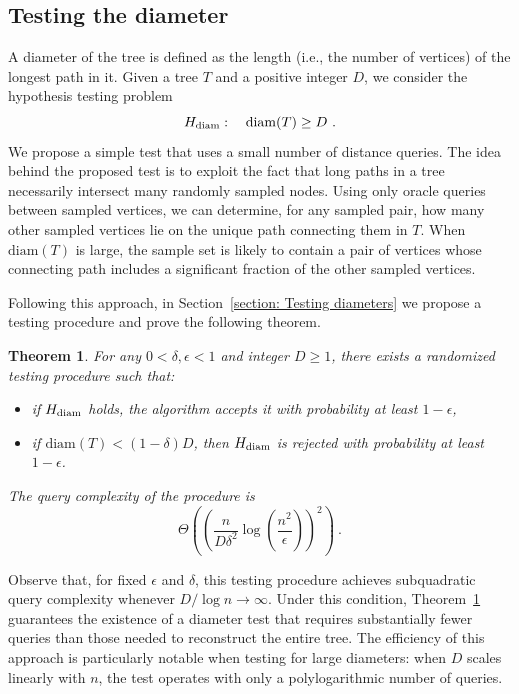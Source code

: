 \documentclass[12pt]{article}
\newtheorem{theorem}{Theorem}[section]
\newcommand{\diam}[1]{\mathrm{diam}\!\left(#1\right)}
\begin{document}
\subsection{Testing the diameter}\label{sec:diam0}

A diameter of the tree is defined as the length (i.e., the number of vertices) of the longest path in it.  Given a tree $T$ and a positive integer $D$, we consider the hypothesis testing problem
\[
H_{\rm diam}: \quad  \diam{T} \ge D~.
\]
We propose a simple test that uses a small number of distance queries.
The idea behind the proposed test is to exploit the fact that long paths in a tree necessarily intersect many randomly sampled nodes. 
Using only oracle queries between sampled vertices, we can determine, for any sampled pair, how many other sampled vertices lie on the unique path connecting them in \(T\).
When \(\diam{T}\) is large, the sample set is likely to contain a pair of vertices whose connecting path includes a significant fraction of the other sampled vertices.

Following this approach, in Section~\ref{section: Testing diameters}  we propose a testing procedure and prove the following theorem.
\begin{theorem}\label{thm: diameter test}
For any $0<\delta,\epsilon<1$ and integer $D\ge 1$, there exists a randomized testing procedure such that:
\begin{itemize}
    \item [(i)] if $H_{\rm diam}$ holds, the algorithm accepts it with probability at least $1 - \epsilon$, 
    \item [(ii)] if $\mathrm{diam}(T) < (1 - \delta)D$, then $H_{\rm diam}$ is rejected with probability at least $1 - \epsilon$.
\end{itemize}
The query complexity of the procedure is
\[
\Theta\!\left(
    \left(
        \frac{n}{D\delta^2}
        \log\!\left(\frac{n^2}{\epsilon}\right)
    \right)^2
\right)~.
\]
\end{theorem}

\noindent
Observe that, for fixed $\epsilon$ and $\delta$, this testing procedure achieves subquadratic query complexity whenever $D/\log n\to \infty$.
Under this condition, Theorem~\ref{thm: diameter test} guarantees the existence of a diameter test that requires substantially fewer queries than those needed to reconstruct the entire tree. 
The efficiency of this approach is particularly notable when testing for large diameters: when $D$ scales linearly with $n$, the test operates with only a polylogarithmic number of queries.
\end{document}

